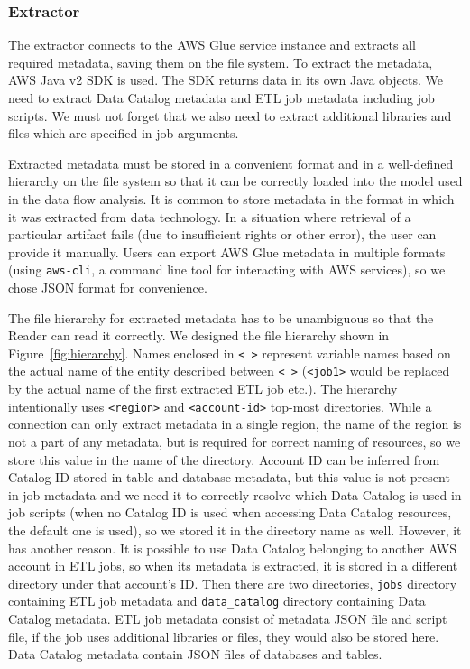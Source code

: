 \subsubsection{Extractor}
The extractor connects to the AWS Glue service instance and extracts all required metadata, saving them on the file system. To extract the metadata, AWS Java v2 SDK is used. The SDK returns data in its own Java objects. We need to extract Data Catalog metadata and ETL job metadata including job scripts. We must not forget that we also need to extract additional libraries and files which are specified in job arguments.
\par
Extracted metadata must be stored in a convenient format and in a well-defined hierarchy on the file system so that it can be correctly loaded into the model used in the data flow analysis. It is common to store metadata in the format in which it was extracted from data technology. In a situation where retrieval of a particular artifact fails (due to insufficient rights or other error), the user can provide it manually. Users can export AWS Glue metadata in multiple formats (using \texttt{aws-cli}, a command line tool for interacting with AWS services), so we chose JSON format for convenience.
\par
The file hierarchy for extracted metadata has to be unambiguous so that the Reader can read it correctly. We designed the file hierarchy shown in Figure~\ref{fig:hierarchy}. Names enclosed in \texttt{< >} represent variable names based on the actual name of the entity described between \texttt{< >} (\texttt{<job1>} would be replaced by the actual name of the first extracted ETL job etc.). The hierarchy intentionally uses \texttt{<region>} and \texttt{<account-id>} top-most directories. While a connection can only extract metadata in a single region, the name of the region is not a part of any metadata, but is required for correct naming of resources, so we store this value in the name of the directory. Account ID can be inferred from Catalog ID stored in table and database metadata, but this value is not present in job metadata and we need it to correctly resolve which Data Catalog is used in job scripts (when no Catalog ID is used when accessing Data Catalog resources, the default one is used), so we stored it in the directory name as well. However, it has another reason. It is possible to use Data Catalog belonging to another AWS account in ETL jobs, so when its metadata is extracted, it is stored in a different directory under that account's ID. Then there are two directories, \texttt{jobs} directory containing ETL job metadata and \texttt{data\_catalog} directory containing Data Catalog metadata. ETL job metadata consist of metadata JSON file and script file, if the job uses additional libraries or files, they would also be stored here. Data Catalog metadata contain JSON files of databases and tables.

